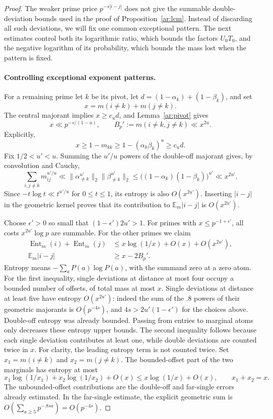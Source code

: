 \begin{proof}
The weaker prime price $p^{-s|i-j|}$ does not give the summable
double-deviation bounds used in the proof of Proposition~\ref{ar:lcm}.
Instead of discarding all such deviations, we will fix one common
exceptional pattern. The next estimates control both its logarithmic
ratio, which bounds the factors $U_0T_0$, and the negative logarithm
of its probability, which bounds the mass lost when the pattern is fixed.

\paragraph{Controlling exceptional exponent patterns.}
For a remaining prime let $k$ be its pivot, let
$d=(1-\alpha_k)+(1-\beta_k)$, and set
\[
 x=m(i\ne k)+m(j\ne k).
\]
The central majorant implies $x\ge c_ud$, and Lemma~\ref{ar:pivot}
gives
\[
 x\ll p^{-s/(1-u)},\qquad
 B_p':=m(i\ne k,j\ne k)\ll x^{2u}.
\]
Explicitly,
\[
 x\ge1-m_{kk}\ge1-(\alpha_k\beta_k)^u\ge c_ud.
\]
Fix $1/2<u'<u$. Summing the $u'/u$ powers of the double-off majorant
gives, by convolution and Cauchy,
\[
 \sum_{i,j\ne k}m_{ij}^{u'/u}
 \ll\|\alpha_{\ne k}^{u'}\|_2\|\beta_{\ne k}^{u'}\|_2
 \le\bigl((1-\alpha_k)(1-\beta_k)\bigr)^{u'}
 \ll x^{2u'}.
\]
Since
$-t\log t\ll t^{u'/u}$ for $0\le t\le1$, its entropy is also
$O(x^{2u'})$. Inserting $|i-j|$ in the geometric kernel proves that
its contribution to $\mathbb E_m|i-j|$ is $O(x^{2u'})$.

Choose $\epsilon'>0$ so small that $(1-\epsilon')2u'>1$. For primes
with $x\le p^{-1+\epsilon'}$, all costs $x^{2u'}\log p$ are summable.
For the other primes we claim
\begin{align}
 \operatorname{Ent}_m(i)+\operatorname{Ent}_m(j)
 &\le x\log(1/x)+O(x)+O(x^{2u'}),\label{ar:marginal-entropy}\\
 \mathbb E_m|i-j|&\ge x-2B_p'.\label{ar:ratio-expectation}
\end{align}
Entropy means $-\sum_aP(a)\log P(a)$, with the summand zero at a zero
atom. For the first inequality, single deviations at distance at most
four occupy a bounded number of offsets, of total mass at most $x$.
Single deviations at distance at least five have entropy
$O(x^{2u'})$: indeed the sum of the $.8$ powers of their geometric
majorants is $O(p^{-4s})$, and $4s>2u'(1-\epsilon')$ for the choices
above. Double-off entropy was already bounded. Passing from entries
to marginal atoms only decreases these entropy upper bounds. The second
inequality follows because each single deviation contributes at least
one, while double deviations are counted twice in $x$.
For clarity, the leading entropy term is not counted twice. Set
$x_1=m(i\ne k)$ and $x_2=m(j\ne k)$. The bounded-offset part of the
two marginals has entropy at most
\[
 x_1\log(1/x_1)+x_2\log(1/x_2)+O(x)
 \le x\log(1/x)+O(x),\qquad x_1+x_2=x.
\]
The unbounded-offset contributions are the double-off and far-single
errors already estimated. In the far-single estimate, the explicit
geometric sum is
$O(\sum_{a\ge5}p^{-.8sa})=O(p^{-4s})$.


\end{proof}
